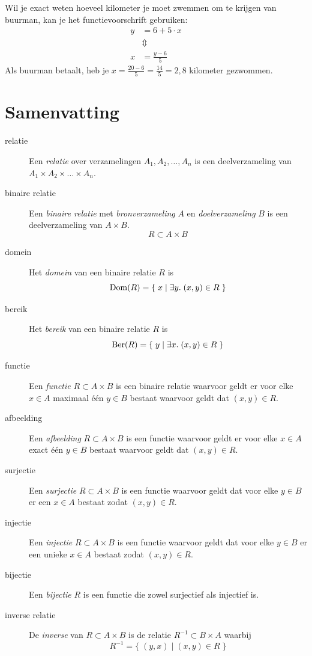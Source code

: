 Wil je exact weten hoeveel kilometer je moet zwemmen om  te krijgen van buurman, kan je het functievoorschrift gebruiken:
\[
\begin{split}
y&=6+5\cdot x\\
& \Updownarrow\\
x&=\frac{y-6}{5}
\end{split}
\]
Als buurman  betaalt, heb je $x=\frac{20-6}{5}=\frac{14}{5}=2,8$ kilometer gezwommen.

\section{Samenvatting}
\begin{description}
  \item[relatie] Een \emph{relatie} over verzamelingen $A_1, A_2, \dots, A_n$ is een deelverzameling van $A_1 \times A_2 \times \dots \times A_n$.
  \item[binaire relatie] Een \emph{binaire relatie} met \emph{bronverzameling} $A$ en \emph{doelverzameling} $B$ is een deelverzameling van $A \times B$.
    \[ R \subset A \times B \]
  \item[domein] Het \emph{domein} van een binaire relatie $R$ is
    \[ \text{Dom}(R) = \{ \; x \;|\; \exists y. \; (x, y) \in R \; \} \]
  \item[bereik] Het \emph{bereik} van een binaire relatie $R$ is
    \[ \text{Ber}(R) = \{ \; y \;|\; \exists x. \; (x, y) \in R \; \} \]
  \item[functie] Een \emph{functie} $R \subset A \times B$ is een binaire relatie waarvoor geldt er voor elke $x \in A$ maximaal \'e\'en $y \in B$ bestaat waarvoor geldt dat $(x,y) \in R$.
  \item[afbeelding] Een \emph{afbeelding} $R \subset A \times B$ is een functie waarvoor geldt er voor elke $x \in A$ exact \'e\'en $y \in B$ bestaat waarvoor geldt dat $(x, y) \in R$.
  \item[surjectie] Een \emph{surjectie} $R \subset A \times B$ is een functie waarvoor geldt dat voor elke $y \in B$ er een $x \in A$ bestaat zodat $(x, y) \in R$.
  \item[injectie] Een \emph{injectie} $R \subset A \times B$ is een functie waarvoor geldt dat voor elke $y \in B$ er een unieke $x \in A$ bestaat zodat $(x, y) \in R$.
  \item[bijectie] Een \emph{bijectie} $R$ is een functie die zowel surjectief als injectief is.
  \item[inverse relatie] De \emph{inverse} van $R \subset A \times B$ is de relatie $R^{-1} \subset B \times A$ waarbij
    \[ R^{-1} = \{ \; (y, x) \;|\; (x, y) \in R \; \} \]
\end{description}




